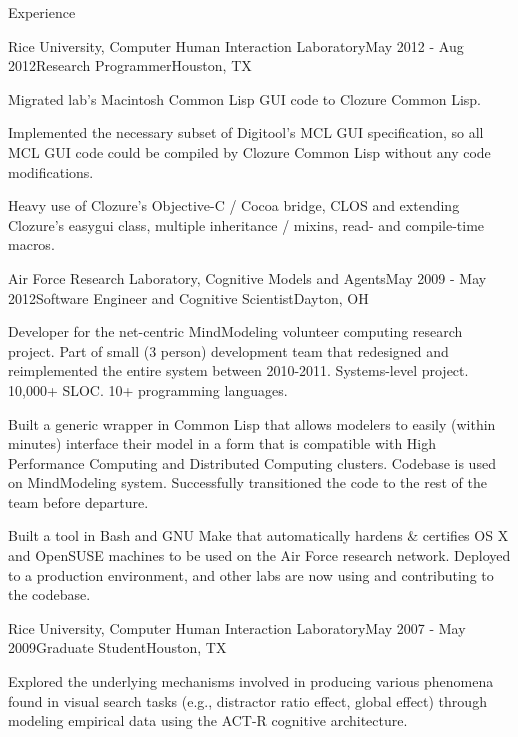 \documentclass{resume} %
\begin{document}
\begin{rSection}{Experience}

\begin{rSubsection}{Rice University, Computer Human Interaction Laboratory}{May 2012 - Aug 2012}{Research Programmer}{Houston, TX}
\item Migrated lab's Macintosh Common Lisp GUI code to Clozure Common Lisp. 
\item Implemented the necessary subset of Digitool's MCL GUI specification, so all MCL GUI code could be compiled by Clozure Common Lisp without any code modifications.
\item Heavy use of Clozure's Objective-C / Cocoa bridge, CLOS and extending Clozure's easygui class, multiple inheritance / mixins, read- and compile-time macros.
\end{rSubsection}

\begin{rSubsection}{Air Force Research Laboratory, Cognitive Models and Agents}{May 2009 - May 2012}{Software Engineer and Cognitive Scientist}{Dayton, OH}
\item Developer for the net-centric MindModeling volunteer computing research project.
Part of small (3 person) development team that redesigned and reimplemented the entire system between 2010-2011.
Systems-level project. 10,000+ SLOC. 10+ programming languages.
\item Built a generic wrapper in Common Lisp that allows modelers to easily
(within minutes) interface their model in a form that is compatible with High Performance Computing and Distributed Computing clusters.
Codebase is used on MindModeling system.
Successfully transitioned the code to the rest of the team before departure.
\item Built a tool in Bash and GNU Make that automatically hardens \& certifies OS X and OpenSUSE machines to be used on the Air Force research network.
Deployed to a production environment, and other labs are now using and contributing to the codebase.
\end{rSubsection}

\begin{rSubsection}{Rice University, Computer Human Interaction Laboratory}{May 2007 - May 2009}{Graduate Student}{Houston, TX}
\item Explored the underlying mechanisms involved in producing various phenomena found in visual search tasks
(e.g., distractor ratio effect, global effect) through modeling empirical data using the ACT-R cognitive architecture. 
\end{rSubsection}


\end{rSection}
\end{document}
